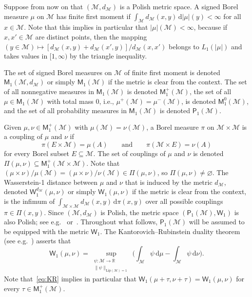 \documentclass[11pt,reqno]{amsart}
\renewcommand{\le}{\leqslant}
\newcommand{\ud}[0]{\,\mathrm{d}}
\newcommand{\R}{\mathbb R}
\theoremstyle{remark}
\newcommand{\MM}{\mathcal{M}}
\renewcommand{\subset}{\subseteq}
\newcommand{\W}{\mathsf{W}}
\newcommand{\Lip}{\mathrm{Lip}}
\renewcommand{\emptyset}{\varnothing}
\renewcommand{\1}{\mathbf 1}
\begin{document}
Suppose from now on that $(\MM,d_\MM)$ is a Polish metric space. A signed Borel measure $\mu$ on $\MM$ has finite first moment if $\int_\MM d_\MM(x,y)\ud|\mu|(y)<\infty$ for all $x\in \MM$. Note that this implies in particular that $|\mu|(\MM)<\infty$, because if $x,x'\in \MM$ are distinct points, then the mapping $(y\in \MM)\mapsto [d_\MM(x,y)+d_\MM(x',y)]/d_\MM(x,x')$ belongs to $L_1(|\mu|)$ and  takes values in $[1,\infty)$ by the triangle inequality.

 The set of signed Borel measures on $\MM$ of finite first moment is denoted $\mathsf{M}_1(\MM,d_\MM)$ or simply $\mathsf{M}_1(\MM)$ if the metric is clear from the context. The set of all  nonnegative measures in $\mathsf{M}_1(\MM)$ is denoted $\mathsf{M}_1^+(\MM)$, the set of all $\mu\in \mathsf{M}_1(\MM)$ with total mass $0$, i.e., $\mu^+(\MM)=\mu^-(\MM)$, is denoted $\mathsf{M}_1^0(\MM)$,  and the set of all  probability measures in $\mathsf{M}_1(\MM)$ is denoted $\mathsf{P}_1(\MM)$.

Given $\mu,\nu\in \mathsf{M}^+_1(\MM)$ with $\mu(\MM)=\nu(\MM)$, a Borel measure $\pi$ on $\MM\times \MM$ is a coupling of $\mu$ and $\nu$ if $$\pi(E\times \MM)=\mu(A)\qquad \mathrm{and} \qquad \pi(\MM\times E)=\nu(A)$$ for every Borel subset $E\subset \MM$. The set of couplings of $\mu$ and $\nu$ is denoted $\Pi(\mu,\nu)\subset \mathsf{M}^+_1(\MM\times \MM)$. Note that $(\mu\times \nu)/\mu(\MM)=(\mu\times \nu)/\nu(\MM)\in \Pi(\mu,\nu)$, so $\Pi(\mu,\nu)\neq\emptyset $.  The Wasserstein-1 distance between $\mu$ and $\nu$ that is induced by the metric $d_\MM$, denoted $\W_1^{d_\MM}(\mu,\nu)$ or simply $\W_1(\mu,\nu)$ if the metric is clear from the context, is the infimum of $\int_{\MM\times \MM} d_\MM(x,y)\ud \pi(x,y)$ over all possible couplings $\pi\in \Pi(x,y)$. Since $(\MM,d_\MM)$ is Polish, the metric space $(\mathsf{P}_1(\MM),\W_1)$ is also Polish; see e.g.~\cite{Bol08} or~\cite[Proposition~7.1.5]{AGS08}. Throughout what follows, $\mathsf{P}_1(\MM)$ will be assumed to be equipped with the metric $\W_1$.  The Kantorovich--Rubinstein duality theorem (see e.g.~\cite[Theorem~5.10]{Vil09}) asserts that
 \begin{equation}\label{eq:KR}
 \W_1(\mu,\nu)=\sup_{\substack{\psi:\MM\to \R\\ \|\psi\|_{\Lip(\MM)= 1}}}\bigg(\int_\MM \psi \ud \mu-\int_\MM \psi \ud \nu\bigg).
 \end{equation}
Note that~\eqref{eq:KR} implies in particular  that $ \W_1(\mu+\tau,\nu+\tau)= \W_1(\mu,\nu)$ for every $\tau\in \mathsf{M}^+_1(\MM)$.
\end{document}
